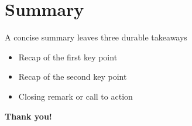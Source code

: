 \section{Summary}

\begin{frame}{A concise summary leaves three durable takeaways}
\begin{itemize}[<+->]
  \item Recap of the first key point
  \item Recap of the second key point
  \item Closing remark or call to action
\end{itemize}
\vspace{1.5em}
\begin{center}
  \textbf{\large Thank you!}
\end{center}
\end{frame}
